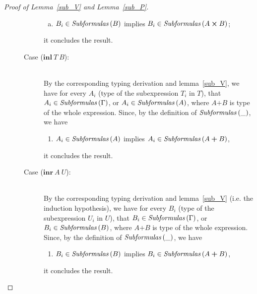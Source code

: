 \documentclass[a4paper]{article}
\newcommand{\typprd}[2]{#1\boldsymbol{\times}#2}
\newcommand{\typsum}[2]{#1\boldsymbol{+}#2}
\newcommand{\explft}[2]{\mathbf{inl}\ #1\ #2}
\newcommand{\exprgt}[2]{\mathbf{inr}\ #1\ #2}
\newcommand{\txt}[1]{\text{\textit{#1}}}
\newcommand{\subformulas}[1]{\txt{Subformulas}\,(#1)}
\begin{document}
\begin{proof}[Proof of Lemma~\ref{sub_V} and Lemma~\ref{sub_P}]
\begin{description}
\begin{description}
\begin{enumerate}[(a)]
     \item $B_i \in \subformulas{B}$ implies $B_i \in \subformulas{\typprd{A}{B}}$;
  \end{enumerate}
  it concludes the result.
\item[Case ($\explft{T}{B}$):]\ \\
  By the corresponding typing derivation and lemma~\ref{sub_V}, we
  have for every $A_i$ (type of the subexpression $T_i$ in $T$), that
  $A_i \in \subformulas{\Gamma}$, or $A_i \in \subformulas{A}$, where
  $\typsum{A}{B}$ is type of the whole expression.  Since, by the
  definition of $\subformulas{\_}$, we have
  \begin{enumerate}[] 
     \item $A_i \in \subformulas{A}$ implies $A_i \in \subformulas{\typsum{A}{B}}$,
  \end{enumerate}
  it concludes the result. 
\item[Case ($\exprgt{A}{U}$):]\ \\
  By the corresponding typing derivation and lemma~\ref{sub_V}
  (i.e. the induction hypothesis), we have for every $B_i$ (type of
  the subexpression $U_i$ in $U$), that $B_i \in
  \subformulas{\Gamma}$, or $B_i \in \subformulas{B}$,
  where $\typsum{A}{B}$ is type of the whole expression.
  Since, by the definition of $\subformulas{\_}$, we have
  \begin{enumerate}[] 
     \item $B_i \in \subformulas{B}$ implies $B_i \in \subformulas{\typsum{A}{B}}$,
  \end{enumerate}
  it concludes the result.
\end{description}


\end{description}
\end{proof}
\end{document}
